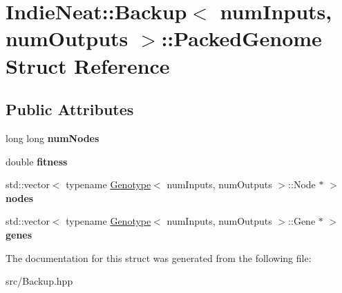 \hypertarget{struct_indie_neat_1_1_backup_1_1_packed_genome}{}\section{Indie\+Neat\+:\+:Backup$<$ num\+Inputs, num\+Outputs $>$\+:\+:Packed\+Genome Struct Reference}
\label{struct_indie_neat_1_1_backup_1_1_packed_genome}
\subsection*{Public Attributes}
\begin{DoxyCompactItemize}
\item 
\mbox{\label{struct_indie_neat_1_1_backup_1_1_packed_genome_a8fe278f6fa33061fc8c3bdf0484d582e}} 
long long {\bfseries num\+Nodes}
\item 
\mbox{\label{struct_indie_neat_1_1_backup_1_1_packed_genome_a4ccbe78013e1121f62e5f04cf3fc0273}} 
double {\bfseries fitness}
\item 
\mbox{\label{struct_indie_neat_1_1_backup_1_1_packed_genome_a540728e0e897a51437f79eea85cf9d95}} 
std\+::vector$<$ typename \hyperlink{class_indie_neat_1_1_genotype}{Genotype}$<$ num\+Inputs, num\+Outputs $>$\+::Node $\ast$ $>$ {\bfseries nodes}
\item 
\mbox{\label{struct_indie_neat_1_1_backup_1_1_packed_genome_ad5bb9e15c7c9a81b2acc466e9434a4c2}} 
std\+::vector$<$ typename \hyperlink{class_indie_neat_1_1_genotype}{Genotype}$<$ num\+Inputs, num\+Outputs $>$\+::Gene $\ast$ $>$ {\bfseries genes}
\end{DoxyCompactItemize}


The documentation for this struct was generated from the following file\+:\begin{DoxyCompactItemize}
\item 
src/Backup.\+hpp\end{DoxyCompactItemize}
